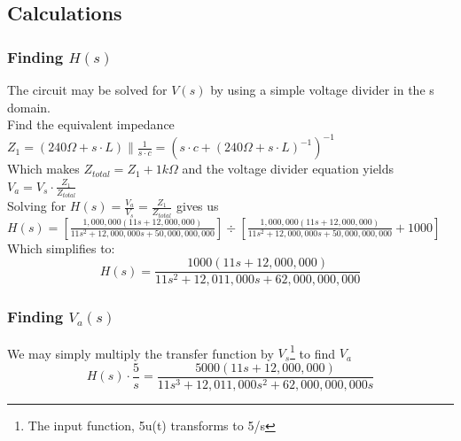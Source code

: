 \documentclass[11pt]{article}
\begin{document}
	
	\subsection*{Calculations}
	
	\subsubsection*{Finding $H(s)$}
	The circuit may be solved for $V(s)$ by using a simple voltage divider in the s domain.\\ 
	Find the equivalent impedance $Z_1= (240 \Omega + s \cdot L) \parallel \frac{1}{s\cdot c} = (s\cdot c+(240 \Omega + s \cdot L)^{-1})^{-1}$ \\
	Which makes $Z_{total}=Z_1+1k\Omega$ and the voltage divider equation yields $V_a=V_s\cdot \frac{Z_1}{Z_{total}}$\\
	Solving for $H(s)=\frac{V_a}{V_s}=\frac{Z_1}{Z_{total}}$ gives us\\
	$ H(s)= \left[\frac{1,000,000(11s+12,000,000)}{11s^2+12,000,000s+50,000,000,000}\right] \div \left[ \frac{1,000,000(11s+12,000,000)}{11s^2+12,000,000s+50,000,000,000}+1000\right]$\\
	Which simplifies to:
	\[ H(s)= \frac{1000(11s+12,000,000)}{11s^2+12,011,000s+62,000,000,000} \]
	\subsubsection*{Finding $V_a(s)$}
	We may simply multiply the transfer function by $V_s$\footnote{The input function, 5u(t) transforms to 5/s} to find $V_a$\\
	\[ H(s) \cdot \frac{5}{s}= \frac{5000(11s+12,000,000)}{11s^3+12,011,000s^2+62,000,000,000s} \]
	\newpage
\end{document}
